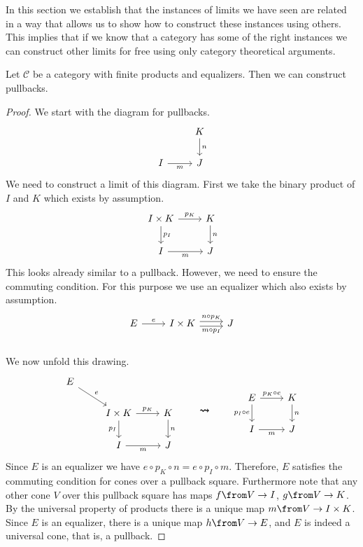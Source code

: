 In this section we establish that the instances of limits we have seen are related
in a way that allows us to show how to construct these instances using others.
This implies that if we know that a category has some of the right instances
we can construct other limits for free using only category theoretical arguments.

\begin{theorem}
  \label{pullbackconstruction}
  Let $\mathscr C$ be a category with finite products and equalizers.
  Then we can construct pullbacks.
\end{theorem}
\begin{proof}
We start with the diagram for pullbacks.
\[
  \begin{tikzcd}
    & K \arrow{d}{n} \\
    I \arrow[swap]{r}{m} & J
  \end{tikzcd}
\]
We need to construct a limit of this diagram.
First we take the binary product of $I$ and $K$ which exists by assumption.
\[
  \begin{tikzcd}
    I \times K \arrow{r}{p_K} \arrow{d}{p_I} & K \arrow{d}{n} \\
    I \arrow[swap]{r}{m} & J
  \end{tikzcd}
\]
This looks already similar to a pullback.
However, we need to ensure the commuting condition.
For this purpose we use an equalizer which also exists by assumption.
\[
  \begin{tikzcd}
    E \arrow{r}{e} &
    I \times K
    \arrow[r,shift right,swap, "m \circ p_I"] \arrow[r,shift left, "n \circ p_K"]
    & J \\
  \end{tikzcd}
\]
We now unfold this drawing.
\[
  \begin{tikzcd}
    E \arrow{dr}{e}& &\\
    & I \times K \arrow[swap]{d}{p_I} \arrow{r}{p_K}& K \arrow{d}{n}\\
    & I \arrow[swap]{r}{m} & J
  \end{tikzcd}
  \qquad \bm{\rightsquigarrow} \qquad 
  \begin{tikzcd}
    E \arrow[swap]{d}{p_I \circ e} \arrow{r}{p_K \circ e} & K \arrow{d}{n} \\
    I \arrow[swap]{r}{m} & J
  \end{tikzcd}
\]
Since $E$ is an equalizer we have $e \circ p_K \circ n = e \circ p_I \circ m$.
Therefore, $E$ satisfies the commuting condition for cones over a pullback square.
Furthermore note that any other cone $V$ over this pullback square has maps $f \from V \to I$,
$g \from V \to K$.
By the universal property of products there is a unique map $m \from V \to I \times K$.
Since $E$ is an equalizer, there is a unique map $h \from V \to E$,
and $E$ is indeed a universal cone, that is, a pullback.
\end{proof}

